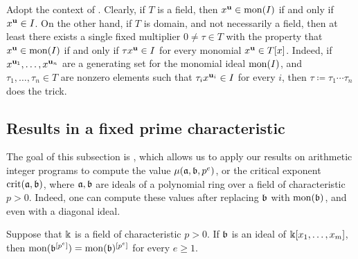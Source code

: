 \documentclass{amsart}
\begin{document}
\begin{remark}
\label{single multiplier: R}
Adopt the context of .  Clearly, if $T$ is a field, then $x^{\mathbf{u}} \in \operatorname{mon}(I)$ if and only if $x^{\mathbf{u}} \in I$.  On the other hand, if $T$ is domain, and not necessarily a field, then at least there exists a single fixed multiplier $0 \neq \tau \in T$ with the property that $x^{\mathbf{u}} \in \operatorname{mon}(I)$ if and only if $\tau x^{\mathbf{u}} \in I$ for every monomial $x^{\mathbf{u}} \in T[x]$.  Indeed, if $x^{\mathbf{u}_1}, \ldots, x^{\mathbf{u}_n}$ are a generating set for the monomial ideal $\operatorname{mon}(I)$, and $\tau_1, \ldots, \tau_n \in T$ are nonzero elements such that $\tau_i x^{\mathbf{u}_i} \in I$ for every $i$, then $\tau\coloneqq \tau_1 \cdots \tau_n$ does the trick.
\end{remark}

\subsection{Results in a fixed prime characteristic}
The goal of this subsection is , which allows us to apply our results on arithmetic integer programs to compute the value $\mu(\mathfrak{a},\mathfrak{b},p^e)$, or the critical exponent $\operatorname{crit}(\mathfrak{a}, \mathfrak{b})$, where $\mathfrak{a}, \mathfrak{b}$ are ideals of a polynomial ring over a field of characteristic $p>0$.  Indeed, one can compute these values after replacing $\mathfrak{b}$ with $\operatorname{mon}(\mathfrak{b})$, and even with a diagonal ideal.



\begin{lemma} \label{frobenius-powers+mon-commute: L}
Suppose that $\Bbbk$ is a field of characteristic $p>0$.  If $\mathfrak{b}$ is an ideal of $\Bbbk[x_1, \ldots, x_m]$, then $\operatorname{mon}(\mathfrak{b}^{[p^e]}) = \operatorname{mon}(\mathfrak{b})^{[p^e]}$ for every $e \geq 1$.
\end{lemma}
\end{document}
